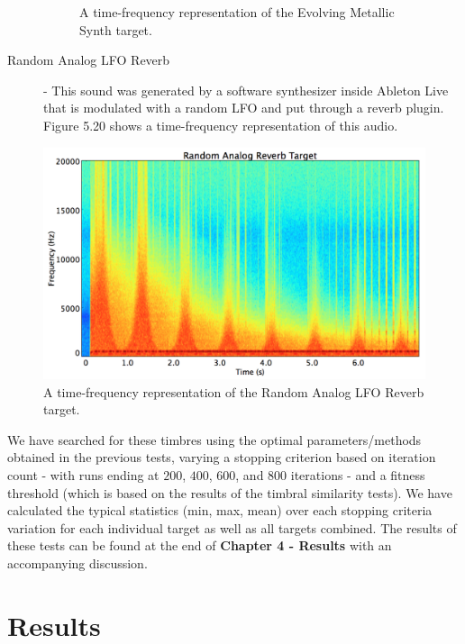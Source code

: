 \documentclass[a4paper,12pt]{report} 	%
\numberwithin{figure}{chapter}
\numberwithin{table}{chapter}
\numberwithin{equation}{chapter}
\begin{document}
\begin{flushleft}
\begin{description}
\begin{figure}[h!]
\begin{center}
\caption[Evolving Metallic Synth Time-Frequency Representation]{A time-frequency representation of the Evolving Metallic Synth target.}
\end{center}
\end{figure}
\item[Random Analog LFO Reverb] - This sound was generated by a software synthesizer inside Ableton Live that is modulated with a random LFO and put through a reverb plugin. Figure 5.20 shows a time-frequency representation of this audio.
\end{description}
\begin{figure}[h!]
\begin{center}
\includegraphics[scale=0.35,width=\linewidth]{RandomAnalogReverbTargetSTFT}
\caption[Random Analog LFO Reverb Time-Frequency Representation]{A time-frequency representation of the Random Analog LFO Reverb target.}
\end{center}
\end{figure}
We have searched for these timbres using the optimal parameters/methods obtained in the previous tests, varying a stopping criterion based on iteration count - with runs ending at $200$, $400$, $600$, and $800$ iterations - and a fitness threshold (which is based on the results of the timbral similarity tests). We have calculated the typical statistics (min, max, mean) over each stopping criteria variation for each individual target as well as all targets combined. The results of these tests can be found at the end of \textbf{Chapter 4 - Results} with an accompanying discussion.

\vspace*{\QuarterPage}
\chapter{Results} %

\end{flushleft}
\end{document}
